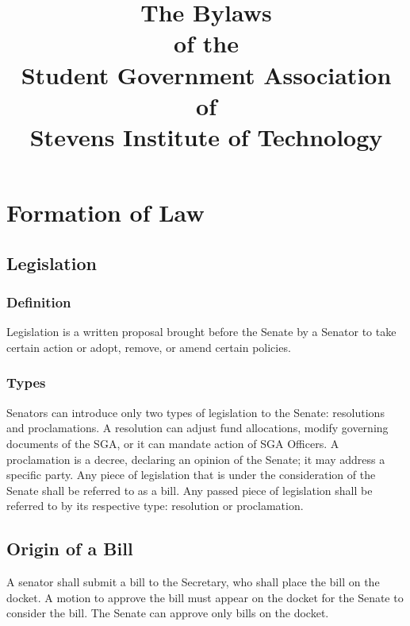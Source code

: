 \documentclass[12pt]{scrreprt}
\begin{document}
\title{The Bylaws \\ of the \\ Student Government Association \\ of \\ Stevens Institute of Technology}
\subtitle{}
\author{}
\date{}
\maketitle

\tableofcontents

\modulolinenumbers[1]
\linenumbers

\chapter{Formation of Law}

\section{Legislation}

\subsection{Definition}
Legislation is a written proposal brought before the Senate by a Senator to take certain action or adopt, remove, or amend certain policies.

\subsection{Types}
Senators can introduce only two types of legislation to the Senate: resolutions and proclamations. A resolution can adjust fund allocations, modify governing documents of the SGA, or it can mandate action of SGA Officers. A proclamation is a decree, declaring an opinion of the Senate; it may address a specific party. Any piece of legislation that is under the consideration of the Senate shall be referred to as a bill. Any passed piece of legislation shall be referred to by its respective type: resolution or proclamation.

\section{Origin of a Bill}
A senator shall submit a bill to the Secretary, who shall place the bill on the docket. A motion to approve the bill must appear on the docket for the Senate to consider the bill. The Senate can approve only bills on the docket.
\end{document}

